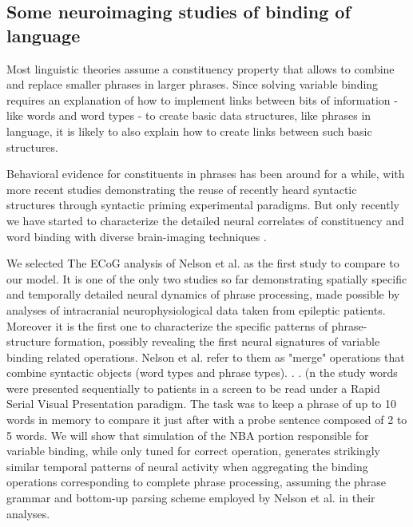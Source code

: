 \documentclass[10pt]{article}
\newcommand{\noteCP}[1]{}
\newcommand{\noteMP}[3]{(}
\begin{document}
\subsection{Some neuroimaging studies of binding of language}

{\label{729344}}

Most linguistic theories assume a constituency property that allows to combine and replace smaller phrases in larger phrases.
Since solving variable binding requires an explanation of how to implement links between bits of information - like words and word types - to create basic data structures, like phrases in language, it is likely to also explain how to create links between such basic structures.

Behavioral evidence for constituents in phrases has been around for a while\cite{bever1969underlying, abrams1969syntactic}, with more recent studies demonstrating the reuse of 
recently heard syntactic structures through syntactic priming experimental paradigms\cite{bock2007persistent, branigan2000syntactic}.
But only recently we have started to characterize the detailed neural correlates of constituency and word binding with diverse brain-imaging techniques
\cite{Nelson_2017, fedorenko2016neural, brennan2016abstract, ding2016cortical, bemis2012basic, Pallier_2011, bastiaansen2010syntactic, longe2006grammatical}.

We selected The ECoG analysis of Nelson et al.\cite{Nelson_2017} as the first study to compare to our model.
It is one of the only two studies so far demonstrating spatially specific and temporally detailed neural dynamics of phrase processing, 
made possible by analyses of intracranial neurophysiological data taken from epileptic patients.
Moreover it is the first one to characterize the specific patterns of phrase-structure formation, possibly revealing the first neural signatures of variable binding 
related operations. Nelson et al. refer to them as "merge" operations that combine syntactic objects (word types and phrase types).
\noteCP{You need to explain here the relationship with merge and variable binding. On the surface, it could seem that they have little in common.}.
\noteCP{Unfortunately, I think this is not clear. You need to make a better case that the combination/merging operation requires variable. binding}.  \noteMP{What about now? Taking into account change to first paragraph}.
In the study words were presented sequentially to patients in a screen to be read under a Rapid Serial Visual Presentation paradigm.
The task was to keep a phrase of up to 10 words in memory to compare it just after with a probe sentence composed of 2 to 5 words.
We will show that simulation of the NBA portion responsible for variable binding, while only tuned for correct operation, generates strikingly similar temporal patterns of 
neural activity when aggregating the binding operations corresponding to complete phrase processing, assuming the phrase grammar and bottom-up parsing scheme employed by 
Nelson et al. in their analyses.
\end{document}
